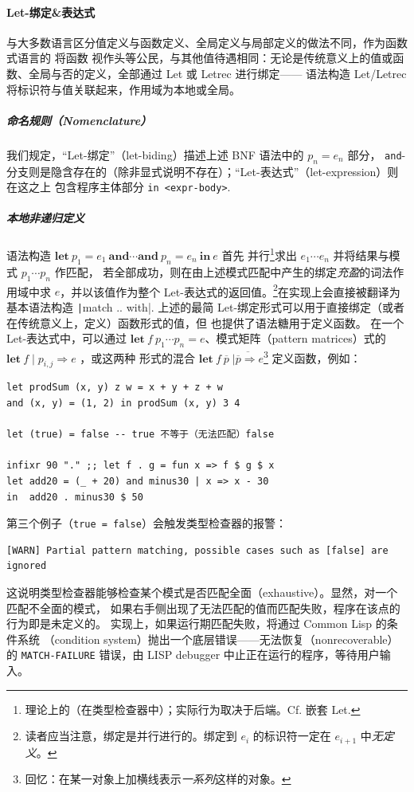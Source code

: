 \paragraph{Let-绑定\&表达式} 与大多数语言区分值定义与函数定义、全局定义与局部定义的做法不同，作为函数式语言的 \Tigris 将函数
视作头等公民，与其他值待遇相同：无论是传统意义上的值或函数、全局与否的定义，全部通过 Let 或 Letrec 进行绑定——
语法构造 Let/Letrec 将标识符与值关联起来，作用域为本地或全局。

{\setlength{\parskip}{-1em}
  \subparagraph*{命名规则（Nomenclature）} 我们规定，“Let-绑定”（let-biding）描述上述 BNF 语法中的 $p_n = e_n$ 部分，
  \texttt{and}-分支则是隐含存在的（除非显式说明不存在）；“Let-表达式”（let-expression）则在这之上
  包含程序主体部分 \texttt{in <expr-body>}.
  \subparagraph*{本地非递归定义} 语法构造 $\mathbf{let}\ p_1 = e_1\ \mathbf{and}\cdots\mathbf{and}\ p_n = e_n\ \mathbf{in}\ e$ 首先
  并行\footnote{理论上的（在类型检查器中）；实际行为取决于后端。Cf. 嵌套 Let.}求出 \(e_1\cdots e_n\) 并将结果与模式 \(p_1\cdots p_n\) 作匹配，
  若全部成功，则在由上述模式匹配中产生的绑定\emph{充盈}的词法作用域中求 $e$，并以该值作为整个 Let-表达式的返回值。\footnote{
    读者应当注意，绑定是并行进行的。绑定到 \(e_{i}\) 的标识符一定在 \(e_{i+1}\) 中\emph{无定义}。
  }在实现上会直接被翻译为基本语法构造 \texttt|match .. with|.
  上述的最简 Let-绑定形式可以用于直接绑定（或者在传统意义上，定义）函数形式的值，但 \Tigris 也提供了语法糖用于定义函数。
  在一个 Let-表达式中，可以通过 \(\mathbf{let}\ f\ p_1\cdots p_n = e\)、模式矩阵（pattern matrices）式的 \(\mathbf{let}\ f\mid p_{i,j}\Rightarrow e\) ，或这两种
  形式的混合 \(\mathbf{let}\ f\ \overline{p}\;\overline{\mid \overline{p}\Rightarrow e}\)\footnote{
    回忆：在某一对象上加横线表示\emph{一系列}这样的对象。
  }
定义函数，例如：}
\begin{verbatim}
let prodSum (x, y) z w = x + y + z + w
and (x, y) = (1, 2) in prodSum (x, y) 3 4

let (true) = false -- true 不等于（无法匹配）false

infixr 90 "." ;; let f . g = fun x => f $ g $ x
let add20 = (_ + 20) and minus30 | x => x - 30
in  add20 . minus30 $ 50
\end{verbatim}
第三个例子（\texttt{true = false}）会触发类型检查器的报警：
\begin{Verbatim}[baselinestretch=1]
[WARN] Partial pattern matching, possible cases such as [false] are ignored
\end{Verbatim}
这说明类型检查器能够检查某个模式是否匹配全面（exhaustive）。显然，对一个匹配不全面的模式，
如果右手侧出现了无法匹配的值而匹配失败，程序在该点的行为即是未定义的。
实现上，如果运行期匹配失败，将通过 Common Lisp 的条件系统
（condition system）抛出一个底层错误——无法恢复（nonrecoverable）的 \texttt{MATCH-FAILURE}
错误，由 LISP debugger 中止正在运行的程序，等待用户输入。

